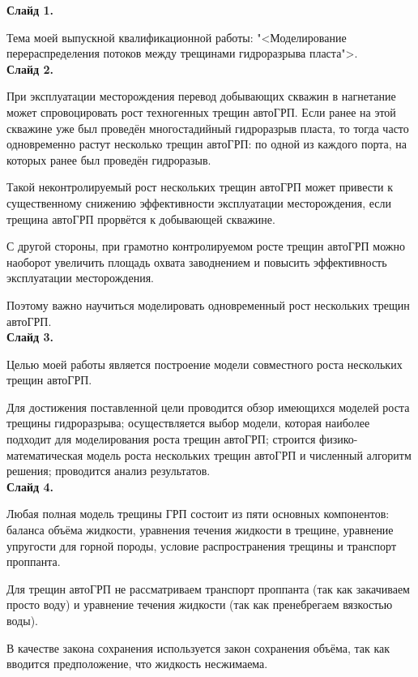 \documentclass[a4paper, 12pt]{article}
\begin{document}

\textbf{Слайд 1.}

Тема моей выпускной квалификационной работы: "<Моделирование перераспределения потоков между трещинами гидроразрыва пласта">.\\

\textbf{Слайд 2.}

При эксплуатации месторождения перевод добывающих скважин в нагнетание может спровоцировать рост техногенных трещин автоГРП.
Если ранее на этой скважине уже был проведён многостадийный гидроразрыв пласта, то тогда часто одновременно растут несколько трещин автоГРП: по одной из каждого порта, на которых ранее был проведён гидроразыв.

Такой неконтролируемый рост нескольких трещин автоГРП может привести к существенному снижению эффективности эксплуатации месторождения, если трещина автоГРП прорвётся к добывающей скважине.

С другой стороны, при грамотно контролируемом росте трещин автоГРП можно наоборот увеличить площадь охвата заводнением и повысить эффективность эксплуатации месторождения.

Поэтому важно научиться моделировать одновременный рост нескольких трещин автоГРП.\\ 

\textbf{Слайд 3.}

Целью моей работы является построение модели совместного роста нескольких трещин автоГРП.

Для достижения поставленной цели проводится обзор имеющихся моделей роста трещины гидроразрыва;
осуществляется выбор модели, которая наиболее подходит для моделирования роста трещин автоГРП;
строится физико-математическая модель роста нескольких трещин автоГРП и численный алгоритм решения;
проводится анализ результатов.\\

\textbf{Слайд 4.}

Любая полная модель трещины ГРП состоит из пяти основных компонентов: баланса объёма жидкости, уравнения течения жидкости в трещине, уравнение упругости для горной породы, условие распространения трещины и транспорт проппанта.

Для трещин автоГРП не рассматриваем транспорт проппанта (так как закачиваем просто воду) и уравнение течения жидкости (так как пренебрегаем вязкостью воды).

В качестве закона сохранения используется закон сохранения объёма, так как вводится предположение, что жидкость несжимаема.
\end{document}

